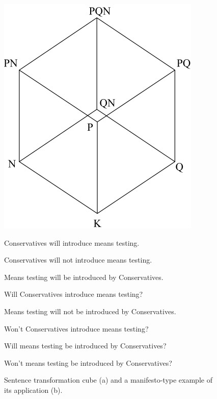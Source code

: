 \documentclass[a4paper, 12pt]{article}
\begin{document}
\begin{figure}[!htb]
\begin{minipage}{0.4\textwidth}
\centering
\includegraphics[width=0.8\linewidth]{sentence_cube.png}
\subcaption{}
\label{fig:sub:sentence-cube}
\end{minipage}
\begin{minipage}{0.6\textwidth}
\centering
\vspace{0.5cm}
\footnotesize
\begin{description}[font={\footnotesize}]
\item [K] Conservatives will introduce means testing.
\item [N] Conservatives will not introduce means testing.
\item [P] Means testing will be introduced by Conservatives.
\item [Q] Will Conservatives introduce means testing?
\item [NP] Means testing will not be introduced by Conservatives.
\item [NQ] Won't Conservatives introduce means testing?
\item [PQ] Will means testing be introduced by Conservatives?
\item [PNQ] Won't means testing be introduced by Conservatives?
\end{description}
\vspace{0.5cm}
\subcaption{}
\label{fig:sub:sentence-example}
\end{minipage}
\caption{Sentence transformation cube \citet[adapted from figure~12 on p.~760]{Miller1962} (a) and a manifesto-type example of its application (b).}
\label{fig:sentence-figure}
\end{figure}
\end{document}

